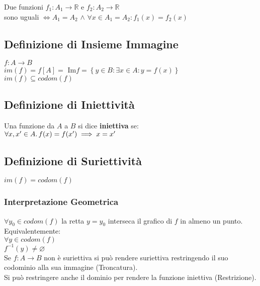 \documentclass[a4paper, twoside, italian, 11pt]{book}
\newcommand{\braces}[1] {\left\{#1\right\}}
\newcommand{\R}{\mathbb{R}}
\let\emptyset\varnothing
\begin{document}
\noindent
Due funzioni $f_1 : A_1 \rightarrow \R$ e $f_2 : A_2 \rightarrow \R$ \\
sono uguali $\iff A_1 = A_2$ $\land$ $\forall x \in A_1 = A_2 : f_1(x) = f_2(x)$


\subsection{Definizione di Insieme Immagine}

\noindent
$f : A \rightarrow B$ \\
$im(f) = f[A] =$ Im$f= \braces{y \in B : \exists x \in A : y = f(x)}$ \\

\noindent
$im(f) \subseteq codom(f)$


\subsection{Definizione di Iniettività}

\noindent
Una funzione da $A$ a $B$ si dice \textbf{iniettiva} se: \\

$\forall x, x' \in A \ldotp f(x) = f(x') \implies x = x'$


\subsection{Definizione di Suriettività}

\noindent
$im(f) = codom(f)$


\subsubsection{Interpretazione Geometrica}

\noindent
$\forall y_0 \in codom(f)$ la retta $y = y_0$ interseca il grafico di $f$ in almeno un punto. \\

\noindent
Equivalentemente: \\
\indent
$\forall y \in codom(f)$ \\
\indent
$f^{-1}({y}) \neq \emptyset$ \\

\noindent
Se $f : A \rightarrow B$ non è suriettiva si può rendere suriettiva restringendo il suo codominio alla sua immagine (Troncatura). \\

\noindent
Si può restringere anche il dominio per rendere la funzione iniettiva (Restrizione). %
\end{document}
